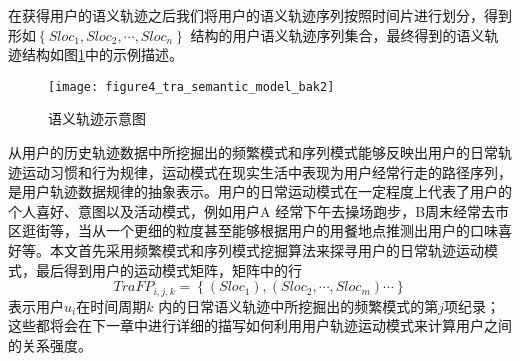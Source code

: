 \par 在获得用户的语义轨迹之后我们将用户的语义轨迹序列按照时间片进行划分，得到形如$\left \{Sloc_{1},Sloc_{2},\cdots ,Sloc_{n} \right \}$ 结构的用户语义轨迹序列集合，最终得到的语义轨迹结构如图\ref{fig:tra_semantic_model}中的示例描述。
\begin{figure}[htp]
\centering
\texttt{[image: figure4\_tra\_semantic\_model\_bak2]}
\caption{语义轨迹示意图}
\label{fig:tra_semantic_model}
\end{figure}
\par 从用户的历史轨迹数据中所挖掘出的频繁模式和序列模式能够反映出用户的日常轨迹运动习惯和行为规律，运动模式在现实生活中表现为用户经常行走的路径序列，是用户轨迹数据规律的抽象表示。用户的日常运动模式在一定程度上代表了用户的个人喜好、意图以及活动模式，例如用户A 经常下午去操场跑步，B周末经常去市区逛街等，当从一个更细的粒度甚至能够根据用户的用餐地点推测出用户的口味喜好等。本文首先采用频繁模式和序列模式挖掘算法来探寻用户的日常轨迹运动模式，最后得到用户的运动模式矩阵，矩阵中的行$$TraFP_{i,j,k}=\left \{  (Sloc_{1}),(Sloc_{2}, \cdots ,Sloc_{m})\cdots   \right \}$$ 表示用户$u_{i}$在时间周期$k$ 内的日常语义轨迹中所挖掘出的频繁模式的第$j$项纪录；这些都将会在下一章中进行详细的描写如何利用用户轨迹运动模式来计算用户之间的关系强度。
